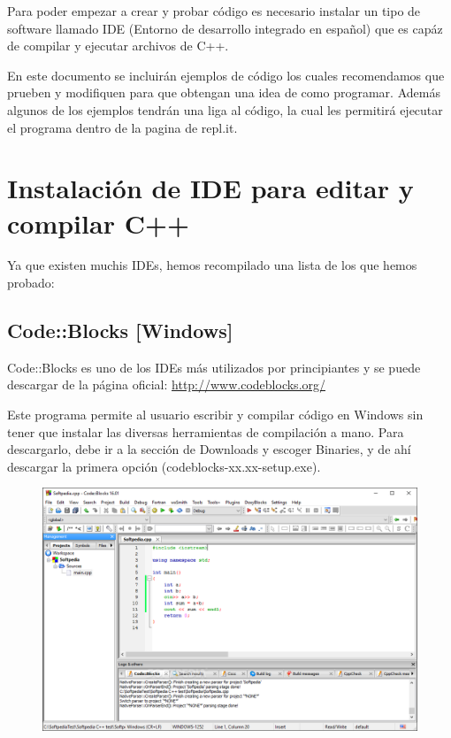 \documentclass{article}
\begin{document}
Para poder empezar a crear y probar código es necesario instalar un tipo de software llamado IDE (Entorno de desarrollo integrado en español) que es capáz de compilar y ejecutar archivos de C++.

En este documento se incluirán ejemplos de código los cuales recomendamos que prueben y modifiquen para que obtengan una idea de como programar. Además algunos de los ejemplos tendrán una liga al código, la cual les permitirá ejecutar el programa dentro de la pagina de repl.it.

\section{Instalación de IDE para editar y compilar C++}

Ya que existen muchis IDEs, hemos recompilado una lista de los que hemos probado:

\subsection{Code::Blocks [Windows]}
Code::Blocks es uno de los IDEs más utilizados por principiantes y se puede descargar de la página oficial: \url{http://www.codeblocks.org/}

Este programa permite al usuario escribir y compilar código en Windows sin tener que instalar las diversas herramientas de compilación a mano. Para descargarlo, debe ir a la sección de Downloads y escoger Binaries, y de ahí descargar la primera opción (codeblocks-xx.xx-setup.exe).

\begin{figure}[H]
    \centering
    \includegraphics[width=0.5\paperwidth]{CodeBlocks}
\end{figure}
\end{document}
